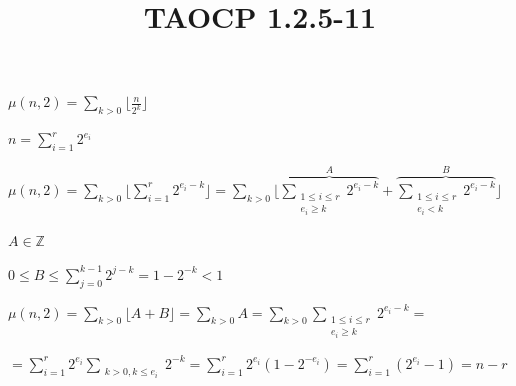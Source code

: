 \documentclass{article}
\title{TAOCP 1.2.5\mbox{-}11}
\begin{document}
\maketitle

\( \mu(n,2) = \sum_{k > 0}{\lfloor{\frac{n}{2^{k}}}\rfloor} \)

\( n = \sum_{i=1}^{r} 2^{e_{i}} \)

\( \mu(n,2) = \sum_{k > 0}{\lfloor{\sum_{i=1}^{r} 2^{e_{i}-k}}\rfloor} = \sum_{k > 0}{\lfloor{\overbrace{\sum_{\substack{1 \leq i \leq r\\ e_{i} \geq k}} 2^{e_{i}-k}}^{A} + \overbrace{\sum_{\substack{1 \leq i \leq r\\ e_{i} < k}} 2^{e_{i}-k}}^{B} }\rfloor} \)

\( A \in \mathbb{Z} \)

\( 0 \leq B \leq \sum_{j=0}^{k-1} 2^{j-k} = 1 - 2^{-k} < 1 \)

\( \mu(n,2) = \sum_{k > 0}{\lfloor{A+B}\rfloor} = \sum_{k > 0} A = \sum_{k>0} \sum_{\substack{1 \leq i \leq r\\ e_{i} \geq k}} 2^{e_{i}-k} = \)

\( = \sum_{i=1}^{r} 2^{e_{i}} \sum_{\substack{k>0, k \leq e_{i}}}{2^{-k}} = \sum_{i=1}^r{2^{e_{i}}(1-2^{-e_{i}})} = \sum_{i=1}^{r}(2^{e_{i}}-1) = n - r \)
\end{document}
